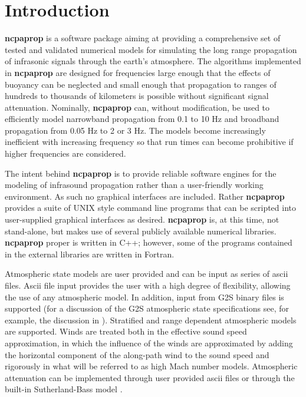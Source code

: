 \section{Introduction}
\label{sec: intro}

\textbf{ncpaprop} is a software package aiming at providing a comprehensive set of tested and validated numerical models for  simulating the long range propagation of infrasonic signals through the earth's atmosphere. The algorithms implemented in \textbf{ncpaprop} are designed for frequencies large enough that the effects of buoyancy can be neglected and small enough that propagation to ranges of hundreds to thousands of kilometers is possible without significant signal attenuation. Nominally,  \textbf{ncpaprop} can, without modification, be used to efficiently model narrowband propagation from 0.1 to 10 Hz and broadband propagation from 0.05 Hz to 2 or 3 Hz. The models become increasingly inefficient with increasing frequency so that run times can become prohibitive if higher frequencies are considered. 

The intent behind \textbf{ncpaprop} is to provide reliable software engines for the modeling of infrasound propagation rather than a user-friendly working environment. As such no graphical interfaces are included. Rather \textbf{ncpaprop} provides a suite of UNIX style command line programs that can be scripted into user-supplied graphical interfaces as desired. \textbf{ncpaprop} is, at this time, not stand-alone, but makes use of several publicly available numerical libraries. \textbf{ncpaprop} proper is written in C++; however, some of the programs contained in the external libraries are written in Fortran. 

Atmospheric state models are user provided and can be input as series of ascii files. Ascii file input provides the user with a high degree of flexibility, allowing the use of any atmospheric model. In addition, input from G2S binary files is supported (for a discussion of the G2S atmospheric state specifications see, for example, the discussion in \cite{drob2019meteorology}). Stratified and range dependent atmospheric models are supported. Winds are treated both in the effective sound speed approximation, in which the influence of the winds are approximated by adding the horizontal component of the along-path wind to the sound speed \cite{Pierce,Godin_eff_fluid} and rigorously in what will be referred to as high Mach number models. Atmospheric attenuation can be implemented through user provided ascii files or through the built-in Sutherland-Bass model \cite{bass_suth}.

